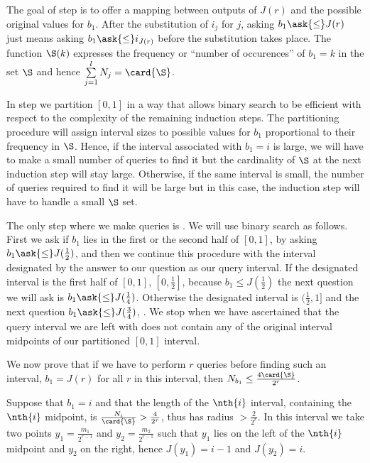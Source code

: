 The goal of step  is to offer a mapping between outputs of $J(r)$
and the possible original values for $b_1$. After the substitution of $i_j$
for $j$, asking $b_1 \ask{\le} J(r)$ just means asking $b_1 \ask{\le}
i_{J(r)}$ before the substitution takes place. The function $\S(k)$ expresses
the frequency or ``number of occurences'' of $b_1 = k$ in the set $\S$ and hence
$\sum\limits_{j=1}^{l} N_j = \card{\S}$.

In step  we partition $[0,1]$ in a way that allows binary search to
be efficient with respect to the complexity of the remaining induction steps.
The partitioning procedure will assign interval sizes to possible values for
$b_1$ proportional to their frequency in $\S$. Hence, if the interval
associated with $b_1 = i$ is large, we will have to make a small number of
queries to find it but the cardinality of $\S$ at the next induction step will
stay large.  Otherwise, if the same interval is small, the number of queries
required to find it will be large but in this case, the induction step will
have to handle a small $\S$ set.

The only step where we make queries is . We will use binary
search as follows. First we ask if $b_1$ lies in the first or the second
half of $[0,1]$, by asking $b_1 \ask{\le} J(\frac{1}{2})$, and then we continue
this procedure with the interval designated by the answer to our question as
our query interval. If the designated interval is the first half of $[0,1]$,
\ie $[0, \frac{1}{2}]$, because $b_1 \le J(\frac{1}{2})$ the next question we
will ask is $b_1 \ask{\le} J(\frac{1}{4})$. Otherwise the designated interval
is $(\frac{1}{2},1]$ and the next question $b_1 \ask{\le} J(\frac{3}{4})$,
\etc. We stop when we have ascertained that the query interval we are left with
does not contain any of the original interval midpoints of our partitioned
$[0,1]$ interval.

We now prove that if we have to perform $r$ queries before
finding such an interval, $b_1 = J(r)$ for all $r$ in this interval, then
$N_{b_1} \le \frac{4\card{\S}}{2^r}$.

Suppose that $b_1 = i$ and that the length of the $\nth{i}$ interval, containing
the $\nth{i}$ midpoint, is $\frac{N_i}{\card{\S}} > \frac{4}{2^r}$, thus has
radius $> \frac{2}{2^r}$. In this interval we take two points $y_1 =
\frac{m_1}{2^{r-1}}$ and $y_2 = \frac{m_2}{2^{r-1}}$ such that $y_1$ lies on
the left of the $\nth{i}$ midpoint and $y_2$ on the right, hence $J(y_1) = i -
1$ and $J(y_2) = i$.

